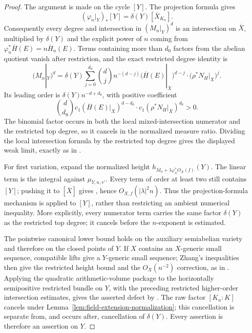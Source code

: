 \documentclass[10pt,a4paper]{amsart}
\theoremstyle{plain}
\theoremstyle{plain}
\numberwithin{equation}{section}
\providecommand{\bM}{\overline{M}}
\begin{document}
\begin{proof}
	The argument is made on the cycle \([Y]\).  The projection formula gives
	\[
	(\varphi_n|_Y)_*[Y]=\delta(Y)[\overline X_{K_n}].
	\]
	Consequently every degree and intersection in \((M_n|_Y)^d\) is an
	intersection on \(\overline X\), multiplied by \(\delta(Y)\) and the explicit
	power of \(n\) coming from
	\(\varphi_n^*\overline H(E)=n\overline H_n(E)\).  Terms containing more than
	\(d_0\) factors from the abelian quotient vanish after restriction, and the
	exact restricted degree identity is
	\[
	(M_n|_Y)^d
	=\delta(Y)\sum_{j=0}^{d_0}\binom dj
	n^{-(d-j)}
	\bigl(\overline H(E)|_{\overline X}\bigr)^{d-j}
	\cdot\bigl(\rho^*N_H|_{\overline X}\bigr)^j.
	\]
	Its leading order is \(\delta(Y)n^{-d+d_0}\), with positive coefficient
	\[
	\binom d{d_0}
	c_1(\overline H(E)|_{\overline X})^{d-d_0}
	\cdot c_1(\rho^*N_H|_{\overline X})^{d_0}>0.
	\]
	The binomial factor occurs in both the local mixed-intersection numerator and
	the restricted top degree, so it cancels in the normalized measure ratio.
	Dividing the local intersection formula by the restricted top degree gives
	the displayed weak limit, exactly as in \cite[Lemmas~4.2--4.3]{Ku1}.
	
	For first variation, expand the normalized height
	\(h_{\bM_n+\lambda\varphi_n^*O_{\overline X}(f)}(Y)\).  The linear term is
	the integral against \(\mu_{Y,n,v'}\).  Every term of order at least two still
	contains \([Y]\); pushing it to \([\overline X]\) gives
	\cite[equations~(4.5)--(4.6)]{Ku1}, hence
	\(O_{X,f}(|\lambda|^2n)\).  Thus the projection-formula mechanism is applied
	to \([Y]\), rather than restricting an ambient numerical inequality.  More
	explicitly, every numerator term carries the same factor \(\delta(Y)\) as the
	restricted top degree; it cancels before the \(n\)-exponent is estimated.
	
	The pointwise canonical lower bound holds on the auxiliary semiabelian
	variety and therefore on the closed points of \(Y\).  If \(X\) contains an
	\(X\)-generic small sequence, compatible lifts give a \(Y\)-generic small
	sequence; Zhang's inequalities then give the restricted height bound and the
	\(O_X(n^{-2})\) correction, as in \cite[Lemma~4.5]{Ku1}.  Applying the
	quadratic arithmetic-volume package to the horizontally semipositive
	restricted bundle on \(Y\), with the preceding restricted higher-order
	intersection estimates, gives the asserted defect by
	\cite[Lemma~4.6]{Ku1}.  The raw factor \([K_n:K]\) cancels under
	Lemma~\ref{lem:field-extension-normalization}; this cancellation is separate
	from, and occurs after, cancellation of \(\delta(Y)\).  Every assertion is
	therefore an assertion on \(Y\).
\end{proof}
\end{document}
